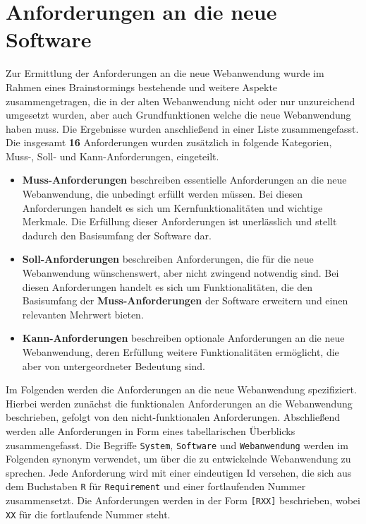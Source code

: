 
\chapter{Anforderungen an die neue Software}
\label{chapter:5}

Zur Ermittlung der Anforderungen an die neue Webanwendung wurde im Rahmen eines Brainstormings bestehende und weitere Aspekte zusammengetragen, die in der alten Webanwendung nicht oder nur unzureichend umgesetzt wurden, aber auch Grundfunktionen welche die neue Webanwendung haben muss. Die Ergebnisse wurden anschließend in einer Liste zusammengefasst. Die insgesamt \textbf{16} Anforderungen wurden zusätzlich in folgende Kategorien, Muss-, Soll- und Kann-Anforderungen, eingeteilt.

\begin{itemize}
    \item \textbf{Muss-Anforderungen} beschreiben essentielle Anforderungen an die neue Webanwendung, die unbedingt erfüllt werden müssen. Bei diesen Anforderungen handelt es sich um Kernfunktionalitäten und wichtige Merkmale. Die Erfüllung dieser Anforderungen ist unerlässlich und stellt dadurch den Basisumfang der Software dar.

    \item \textbf{Soll-Anforderungen} beschreiben Anforderungen, die für die neue Webanwendung wünschenswert, aber nicht zwingend notwendig sind. Bei diesen Anforderungen handelt es sich um Funktionalitäten, die den Basisumfang der \textbf{Muss-Anforderungen} der Software erweitern und einen relevanten Mehrwert bieten.

    \item \textbf{Kann-Anforderungen} beschreiben optionale Anforderungen an die neue Webanwendung, deren Erfüllung weitere Funktionalitäten ermöglicht, die aber von untergeordneter Bedeutung sind.
\end{itemize}

Im Folgenden werden die Anforderungen an die neue Webanwendung spezifiziert. Hierbei werden zunächst die funktionalen Anforderungen an die Webanwendung beschrieben, gefolgt von den nicht-funktionalen Anforderungen. Abschließend werden alle Anforderungen in Form eines tabellarischen Überblicks zusammengefasst. Die Begriffe \texttt{System}, \texttt{Software} und \texttt{Webanwendung} werden im Folgenden synonym verwendet, um über die zu entwickelnde Webanwendung zu sprechen. Jede Anforderung wird mit einer eindeutigen Id versehen, die sich aus dem Buchstaben \texttt{R} für \texttt{Requirement} und einer fortlaufenden Nummer zusammensetzt. Die Anforderungen werden in der Form \texttt{[RXX]} beschrieben, wobei \texttt{XX} für die fortlaufende Nummer steht.

